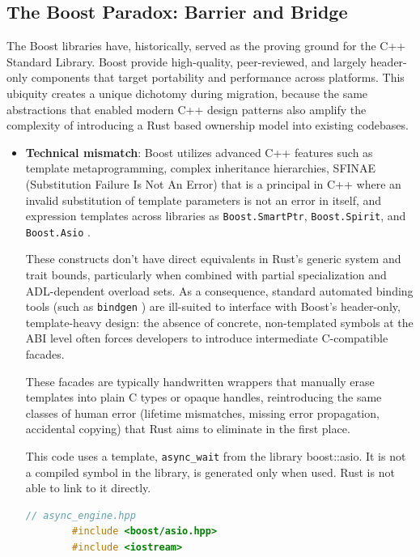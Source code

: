 \subsection{The Boost Paradox: Barrier and Bridge}

The Boost libraries have, historically, served as the proving ground for the C++ Standard Library. 
Boost provide high-quality, peer-reviewed, and largely header-only components that target portability 
and performance across platforms. \parencite{boost_docs} 
This ubiquity creates a unique dichotomy during migration, because the same abstractions that enabled 
modern C++ design patterns  also amplify the complexity of introducing a Rust based ownership model 
into existing codebases.

\begin{itemize}
    \item \textbf{Technical mismatch}: Boost utilizes advanced C++ features such as template metaprogramming, 
    complex inheritance hierarchies, SFINAE (Substitution Failure Is Not An Error) that is a principal in C++ 
    where an invalid substitution of template parameters is not an error in itself, 
    and expression templates across libraries as \texttt{Boost.SmartPtr}, 
    \texttt{Boost.Spirit}, and \texttt{Boost.Asio} \parencite{boost_docs}. 

    These constructs don't have direct equivalents in Rust's generic system and trait bounds, 
    particularly when combined with partial specialization and ADL-dependent overload sets. 
    As a consequence, standard automated binding tools (such as \texttt{bindgen} \parencite{bindgen_docs}) 
    are ill-suited to interface with Boost's header-only, template-heavy design: the absence of concrete, 
    non-templated symbols at the ABI level often forces developers to introduce intermediate C-compatible facades. 
    
    These facades are typically handwritten wrappers that manually erase templates 
    into plain C types or opaque handles, reintroducing the same classes of human error (lifetime mismatches, 
    missing error propagation, accidental copying) that Rust aims to eliminate in the first place.

    This code uses a template, \texttt{async\_wait} from the library boost::asio. 
    It is not a compiled symbol in the library, is generated only when used. Rust is not able to link to it directly.

    \begin{lstlisting}[language=C++]
        // async_engine.hpp
        #include <boost/asio.hpp>
        #include <iostream>


\end{lstlisting}
\end{itemize}
